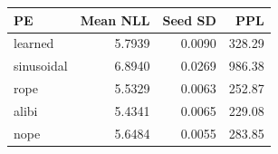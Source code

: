 \begin{tabular}{lrrr}
\hline
PE & Mean NLL & Seed SD & PPL \\
\hline
learned & 5.7939 & 0.0090 & 328.29 \\
sinusoidal & 6.8940 & 0.0269 & 986.38 \\
rope & 5.5329 & 0.0063 & 252.87 \\
alibi & 5.4341 & 0.0065 & 229.08 \\
nope & 5.6484 & 0.0055 & 283.85 \\
\hline
\end{tabular}
